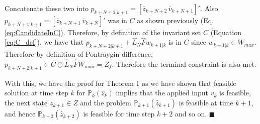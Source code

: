 Concatenate these two into $p_{k+N+2|k+1} = [\bar{z}_{k+N+2}\, \bar{v}_{k+N+1}]'$. Also $p_{k+N+1|k+1} = [\bar{z}_{k+N+1} \,\bar{v}_{k+N}]'$ was in $C$ as shown previously (Eq. \ref{eq:CandidateInC}). Therefore, by definition of the invariant set $C$ (Equation \ref{eq:C_def}), we have that $p_{k+N+2|k+1} + \hat{L}_N \hat{F} w_{k+1|k}$ is in $C$ since $w_{k+1|k}\in W_{max}$. Therefore by definition of Pontraygin difference, $p_{k+N+2|k+1} \in C \ominus \hat{L}_N\hat{F}W_{max} = Z_f$. Therefore the terminal constraint is also met.

With this, we have the proof for Theorem 1 as we have shown that feasible solution at time step $k$ for $\mathbb{P}_{k}(\hat{z}_{k}) $ implies that the applied input $v_k$ is feasible, the next state $z_{k+1} \in Z$ and the problem $\mathbb{P}_{k+1}(\hat{z}_{k+1}) $ is feasible at time $k+1$, and hence  $\mathbb{P}_{k+2}(\hat{z}_{k+2}) $ is feasible for time step $k+2$ and so on. $\blacksquare$






